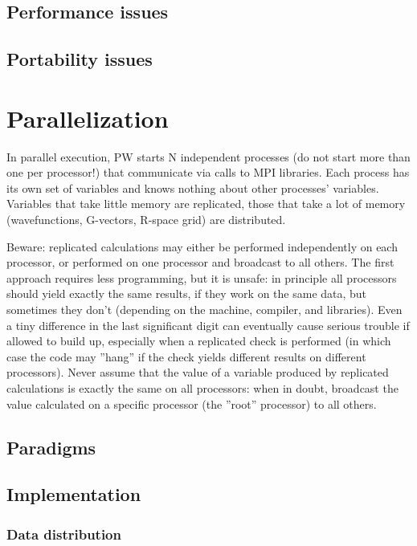 \documentclass[12pt,a4paper]{article}
\begin{document}
\subsection{Performance issues}
\subsection{Portability issues}

\section{ Parallelization}

In parallel execution, PW starts N independent processes (do not start more than one per processor!) that communicate via calls to MPI libraries. Each process has its own set of variables and knows nothing about other processes' variables. Variables that take little memory are replicated, those that take a lot of memory (wavefunctions, G-vectors, R-space grid) are distributed.
    
Beware: replicated calculations may either be performed independently on each processor, or performed on one processor and broadcast to all
others. The first approach requires less programming, but it is unsafe: in principle all processors should yield exactly the same results, if they work on the same data, but sometimes they don't (depending on the machine, compiler, and libraries). Even a tiny difference in the last significant digit can eventually cause serious trouble if allowed to build up, especially when a replicated check is performed (in which
case the code may ''hang'' if the check yields different results on different processors). Never assume that the value of a variable produced by replicated calculations is exactly the same on all processors: when in doubt, broadcast the value calculated on a specific processor (the ''root'' processor) to all others.

\subsection{Paradigms}
\subsection{Implementation}
\subsubsection{ Data distribution}
\end{document}

